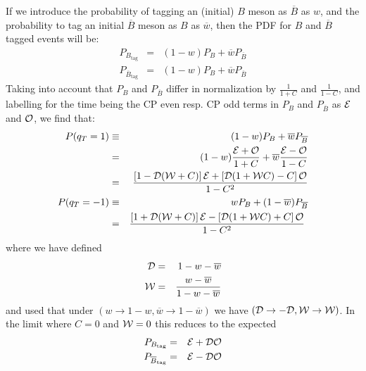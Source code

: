 \documentclass[a4paper,9pt,twoside]{article}
\begin{document}
If we introduce the probability of tagging an (initial) $B$ meson as $\overline{B}$ as $w$, and
the probability to tag an initial $\overline{B}$ meson as $B$ as $\overline{w}$, then the
PDF for $B$ and $\overline{B}$ tagged events will be:
\begin{eqnarray}
   P_{B_\mathrm{tag}} &=& (1-w) P_{B} + \overline{w} P_{\overline{ B} }\\
   P_{\overline{B}_\mathrm{tag}} &=& (1-w) P_{B} + \overline{w} P_{\overline{ B} }
\end{eqnarray} 
Taking into account that $P_{B}$ and $P_{\overline{B}}$ differ in normalization by
$\frac{1}{1+C}$ and $\frac{1}{1-C}$, and labelling for the time being the CP even 
resp. CP odd terms in $P_{B}$ and $P_{\overline{B}}$ as ${\cal E}$
and ${\cal O}$, we find that:
\begin{eqnarray}
   P(q_T=1) &\equiv& (1-w) P_{B} + \overline{w} P_{\overline{ B} } \\
     &=& (1-w)\frac{{\cal E} + {\cal O}}{1+C} + \overline{w}\frac{{\cal E}-{\cal O}}{1-C}  \\
     &=& \frac{  \left[ 1-{\cal D}({\cal W}+C) \right]{\cal E}
                               +\left[ {\cal D}(1 + {\cal W} C) - C \right] {\cal O}
                     }{1-C^2} \\
   P(q_T=-1) &\equiv& w P_{B} + (1-\overline{w}) P_{\overline{ B} } \\
     &=& \frac{  \left[ 1+{\cal D}({\cal W} + C)  \right]{\cal E}
                               -\left[ {\cal D}(1+{\cal W}C) +  C \right] {\cal O}
                        }{1-C^2}\ \\
\end{eqnarray} 
where we have defined
\begin{eqnarray}
 {\cal D} &=&1-w - \overline{w} \\
 {\cal W} &=& \frac{ w - \overline{w}}{1-w-\overline{w}}
\end{eqnarray}
and used that under $(w\rightarrow 1-w, \overline{w}\rightarrow 1-\overline{w})$ we have $({\cal D} \rightarrow -{\cal D},{\cal W}\rightarrow{\cal W})$.
In the limit where $C=0$ and ${\cal W}=0$  this reduces to the expected
\begin{eqnarray}
   P_{B_\mathrm{tag}} &=&   {\cal E} +{\cal D} {\cal O} \\
   P_{\overline{B}_\mathrm{tag}} &=&   {\cal E} -{\cal D} {\cal O} 
\end{eqnarray}
\end{document}
